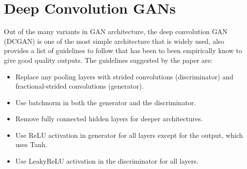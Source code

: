 \documentclass{article}
\begin{document}
\section{Deep Convolution GANs}
\label{deep convolution GANs}
Out of the many variants in GAN architecture, the deep convolution GAN (DCGAN) is one of the most simple architecture that is widely used, \cite{dcgan} also provides a list of guidelines to follow that has been to been empirically know to give good quality outputs. The guidelines suggested by the paper are:
\begin{itemize}
    \item Replace any pooling layers with strided convolutions (discriminator) and fractional-strided
convolutions (generator).
    \item Use batchnorm in both the generator and the discriminator.
    \item Remove fully connected hidden layers for deeper architectures.
    \item Use ReLU activation in generator for all layers except for the output, which uses Tanh.
    \item Use LeakyReLU activation in the discriminator for all layers.
\end{itemize}
\end{document}

